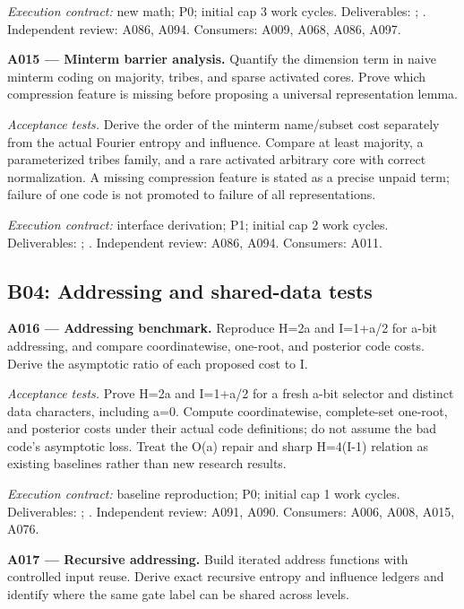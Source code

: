 \documentclass[11pt]{article}
\begin{document}
{\small\emph{Execution contract:} new math; P0; initial cap 3 work cycles. Deliverables: ; . Independent review: A086, A094. Consumers: A009, A068, A086, A097.}

\textbf{A015 --- Minterm barrier analysis.} Quantify the dimension term in naive minterm coding on majority, tribes, and sparse activated cores. Prove which compression feature is missing before proposing a universal representation lemma.

\emph{Acceptance tests.} Derive the order of the minterm name/subset cost separately from the actual Fourier entropy and influence. Compare at least majority, a parameterized tribes family, and a rare activated arbitrary core with correct normalization. A missing compression feature is stated as a precise unpaid term; failure of one code is not promoted to failure of all representations.

{\small\emph{Execution contract:} interface derivation; P1; initial cap 2 work cycles. Deliverables: ; . Independent review: A086, A094. Consumers: A011.}

\subsection{B04: Addressing and shared-data tests}

\textbf{A016 --- Addressing benchmark.} Reproduce H=2a and I=1+a/2 for a-bit addressing, and compare coordinatewise, one-root, and posterior code costs. Derive the asymptotic ratio of each proposed cost to I.

\emph{Acceptance tests.} Prove H=2a and I=1+a/2 for a fresh a-bit selector and distinct data characters, including a=0. Compute coordinatewise, complete-set one-root, and posterior costs under their actual code definitions; do not assume the bad code's asymptotic loss. Treat the O(a) repair and sharp H=4(I-1) relation as existing baselines rather than new research results.

{\small\emph{Execution contract:} baseline reproduction; P0; initial cap 1 work cycles. Deliverables: ; . Independent review: A091, A090. Consumers: A006, A008, A015, A076.}

\textbf{A017 --- Recursive addressing.} Build iterated address functions with controlled input reuse. Derive exact recursive entropy and influence ledgers and identify where the same gate label can be shared across levels.
\end{document}
